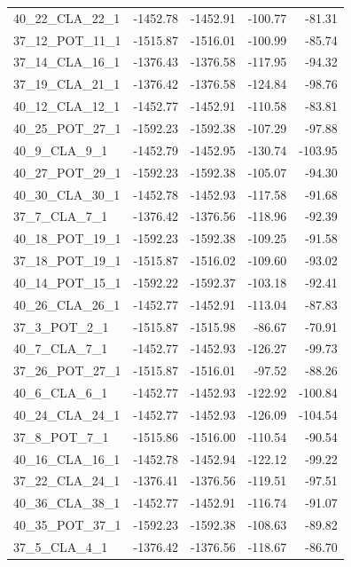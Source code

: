 \documentclass[journal=jacsat,manuscript=article]{achemso}
\begin{document}
\begin{table}[b!]
\begin{tabular}{lrrrr}
40\_22\_CLA\_22\_1 &  -1452.78 &  -1452.91 & -100.77 &  -81.31 \\
37\_12\_POT\_11\_1 &  -1515.87 &  -1516.01 & -100.99 &  -85.74 \\
37\_14\_CLA\_16\_1 &  -1376.43 &  -1376.58 & -117.95 &  -94.32 \\
37\_19\_CLA\_21\_1 &  -1376.42 &  -1376.58 & -124.84 &  -98.76 \\
40\_12\_CLA\_12\_1 &  -1452.77 &  -1452.91 & -110.58 &  -83.81 \\
40\_25\_POT\_27\_1 &  -1592.23 &  -1592.38 & -107.29 &  -97.88 \\
40\_9\_CLA\_9\_1   &  -1452.79 &  -1452.95 & -130.74 & -103.95 \\
40\_27\_POT\_29\_1 &  -1592.23 &  -1592.38 & -105.07 &  -94.30 \\
40\_30\_CLA\_30\_1 &  -1452.78 &  -1452.93 & -117.58 &  -91.68 \\
37\_7\_CLA\_7\_1   &  -1376.42 &  -1376.56 & -118.96 &  -92.39 \\
40\_18\_POT\_19\_1 &  -1592.23 &  -1592.38 & -109.25 &  -91.58 \\
37\_18\_POT\_19\_1 &  -1515.87 &  -1516.02 & -109.60 &  -93.02 \\
40\_14\_POT\_15\_1 &  -1592.22 &  -1592.37 & -103.18 &  -92.41 \\
40\_26\_CLA\_26\_1 &  -1452.77 &  -1452.91 & -113.04 &  -87.83 \\
37\_3\_POT\_2\_1   &  -1515.87 &  -1515.98 &  -86.67 &  -70.91 \\
40\_7\_CLA\_7\_1   &  -1452.77 &  -1452.93 & -126.27 &  -99.73 \\
37\_26\_POT\_27\_1 &  -1515.87 &  -1516.01 &  -97.52 &  -88.26 \\
40\_6\_CLA\_6\_1   &  -1452.77 &  -1452.93 & -122.92 & -100.84 \\
40\_24\_CLA\_24\_1 &  -1452.77 &  -1452.93 & -126.09 & -104.54 \\
37\_8\_POT\_7\_1   &  -1515.86 &  -1516.00 & -110.54 &  -90.54 \\
40\_16\_CLA\_16\_1 &  -1452.78 &  -1452.94 & -122.12 &  -99.22 \\
37\_22\_CLA\_24\_1 &  -1376.41 &  -1376.56 & -119.51 &  -97.51 \\
40\_36\_CLA\_38\_1 &  -1452.77 &  -1452.91 & -116.74 &  -91.07 \\
40\_35\_POT\_37\_1 &  -1592.23 &  -1592.38 & -108.63 &  -89.82 \\
37\_5\_CLA\_4\_1   &  -1376.42 &  -1376.56 & -118.67 &  -86.70 \\
\bottomrule
\end{tabular}
\end{table}
\end{document}
